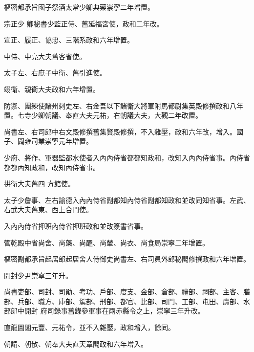 \begin{pinyinscope}
 樞密都承旨國子祭酒太常少卿典藥崇寧二年增置。



 宗正少
 卿秘書少監正侍、舊延福宮使，政和二年改。



 宣正、履正、協忠、三階系政和六年增置。



 中侍、中亮大夫舊客省使。



 太子左、右庶子中衛、舊引進使。



 翊衛、親衛大夫政和六年增置。



 防禦、團練使諸州刺史左、右金吾以下諸衛大將軍附馬都尉集英殿修撰政和八年置。七寺少卿朝議、奉直大夫元祐，右朝議大夫，大觀二年改置。



 尚書左、右司郎中右文殿修撰舊集賢殿修撰，不入雜壓，政和六年改，增入。國子、闢雍司業崇寧元年增置。



 少府、將作、軍器監都水使者入內內侍省都都知政和，改知入內內侍省事。內侍省都都內知政和，改知內侍省事。



 拱衛大夫舊四
 方館使。



 太子少詹事、左右諭德入內內侍省副都知內侍省副都知政和並改同知省事。左武、右武大夫舊東、西上合門使。



 入內內侍省押班內侍省押班政和並改簽書省事。



 管乾殿中省尚舍、尚藥、尚醞、尚輦、尚衣、尚食局崇寧二年增置。



 樞密副都承旨起居郎起居舍人侍御史尚書左、右司員外郎秘閣修撰政和六年增置。



 開封少尹崇寧三年升。



 尚書吏部、司封、司勛、考功、戶部、度支、金部、倉部、禮部、祠部、主客、膳部、兵部、職方、庫部、駕部、刑部、都官、比部、司門、工部、屯田、虞部、水部郎中開封
 府司錄事舊錄參軍事在兩赤縣令之上，崇寧三年升改。



 直龍圖閣元豐、元祐令，並不入雜壓，政和增入，餘同。



 朝請、朝散、朝奉大夫直天章閣政和六年增入。




\end{pinyinscope}
